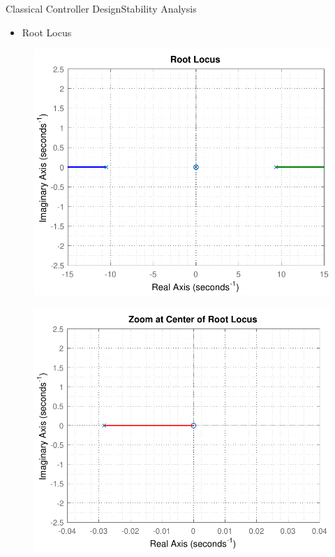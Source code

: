 \begin{frame}{Classical Controller Design}{Stability Analysis}	
\begin{itemize}
	\item Root Locus
\end{itemize}
\begin{minipage}{\linewidth}
	\begin{minipage}{0.45\linewidth}
		\begin{figure}
			\includegraphics[scale=.42]{Pictures/rlocusCubli}
			\centering
		\end{figure}
	\end{minipage}
	\hspace{0.1\linewidth}
	\begin{minipage}{0.45\linewidth}
		\begin{figure}[H]
			\includegraphics[scale=.35]{Pictures/rlocusCubliZoom}
			\centering
		\end{figure}
	\end{minipage}
\end{minipage}
\end{frame}


